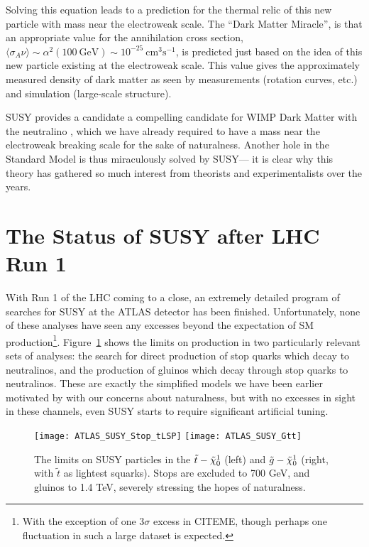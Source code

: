 Solving this equation leads to a prediction for the thermal relic of this new particle with mass near the electroweak scale. The ``Dark Matter Miracle'', is that an appropriate value for the annihilation cross section, $\langle \sigma_A \nu \rangle \sim \alpha^2 (100~\mathrm{GeV})\sim 10^{-25}~\mathrm{cm}^3\mathrm{s}^{-1}$, is predicted just based on the idea of this new particle existing at the electroweak scale. This value gives the approximately measured density of dark matter as seen by measurements (rotation curves, etc.) and simulation (large-scale structure). 

SUSY provides a candidate a compelling candidate for WIMP Dark Matter with the neutralino \lsp, which we have already required to have a mass near the electroweak breaking scale for the sake of naturalness. Another hole in the Standard Model is thus miraculously solved by SUSY--- it is clear why this theory has gathered so much interest from theorists and experimentalists over the years.

\section{The Status of SUSY after LHC Run 1}
\label{chapter:susy:status}


With Run 1 of the LHC coming to a close, an extremely detailed program  of searches for SUSY at the ATLAS detector has been finished. Unfortunately, none of these analyses have seen any excesses beyond the expectation of SM production\footnote{With the exception of one $3\sigma$ excess in CITEME, though perhaps one fluctuation in such a large dataset is expected.}. Figure~\ref{fig:susy:limits} shows the limits on production in two particularly relevant sets of analyses: the search for direct production of stop quarks which decay to neutralinos, and the production of gluinos which decay through stop quarks to neutralinos. These are exactly the simplified models we have been earlier motivated by with our concerns about naturalness, but with no excesses in sight in these channels, even SUSY starts to require significant artificial tuning.


\begin{figure}[htbp]
  \centering
    \texttt{[image: ATLAS\_SUSY\_Stop\_tLSP]}
    \texttt{[image: ATLAS\_SUSY\_Gtt]}
  \caption{The limits on SUSY particles in the $\tilde{t}-\tilde{\chi}_0^1$ (left) and $\tilde{g}-\tilde{\chi}_0^1$ (right, with $\tilde{t}$ as lightest squarks). Stops are excluded to 700 GeV, and gluinos to 1.4 TeV, severely stressing the hopes of naturalness.}
  \label{fig:susy:limits}
\end{figure}


